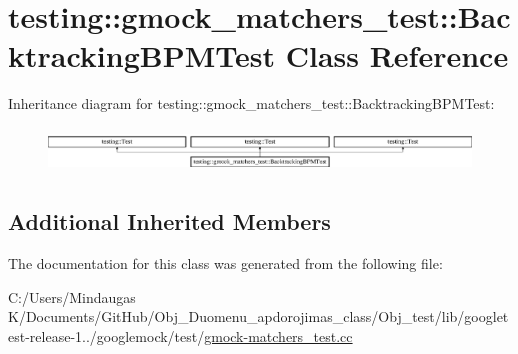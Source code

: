 \hypertarget{classtesting_1_1gmock__matchers__test_1_1_backtracking_b_p_m_test}{}\section{testing\+::gmock\+\_\+matchers\+\_\+test\+::Backtracking\+B\+P\+M\+Test Class Reference}
\label{classtesting_1_1gmock__matchers__test_1_1_backtracking_b_p_m_test}
Inheritance diagram for testing\+::gmock\+\_\+matchers\+\_\+test\+::Backtracking\+B\+P\+M\+Test\+:\begin{figure}[H]
\begin{center}
\leavevmode
\includegraphics[height=1.200429cm]{d4/d1b/classtesting_1_1gmock__matchers__test_1_1_backtracking_b_p_m_test}
\end{center}
\end{figure}
\subsection*{Additional Inherited Members}


The documentation for this class was generated from the following file\+:\begin{DoxyCompactItemize}
\item 
C\+:/\+Users/\+Mindaugas K/\+Documents/\+Git\+Hub/\+Obj\+\_\+\+Duomenu\+\_\+apdorojimas\+\_\+class/\+Obj\+\_\+test/lib/googletest-\/release-\/1../googlemock/test/\mbox{\hyperlink{_obj__test_2lib_2googletest-release-1_88_81_2googlemock_2test_2gmock-matchers__test_8cc}{gmock-\/matchers\+\_\+test.\+cc}}\end{DoxyCompactItemize}
